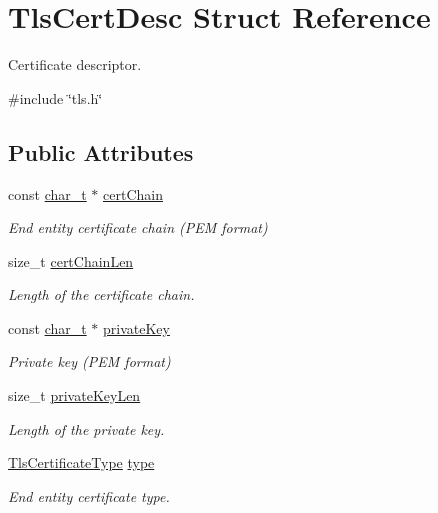 \hypertarget{structTlsCertDesc}{}\section{Tls\+Cert\+Desc Struct Reference}
\label{structTlsCertDesc}


Certificate descriptor.  




{\ttfamily \#include \char`\"{}tls.\+h\char`\"{}}

\subsection*{Public Attributes}
\begin{DoxyCompactItemize}
\item 
const \hyperlink{compiler__port_8h_a40bb5262bf908c328fbcfbe5d29d0201}{char\+\_\+t} $\ast$ \hyperlink{structTlsCertDesc_ae944e03a44368e92bb4955f890381d3d}{cert\+Chain}
\begin{DoxyCompactList}\small\item\em End entity certificate chain (P\+EM format) \end{DoxyCompactList}\item 
size\+\_\+t \hyperlink{structTlsCertDesc_a3b679e405c99f9989713292148f36149}{cert\+Chain\+Len}
\begin{DoxyCompactList}\small\item\em Length of the certificate chain. \end{DoxyCompactList}\item 
const \hyperlink{compiler__port_8h_a40bb5262bf908c328fbcfbe5d29d0201}{char\+\_\+t} $\ast$ \hyperlink{structTlsCertDesc_a3ae3164c84e83982d57e805167860459}{private\+Key}
\begin{DoxyCompactList}\small\item\em Private key (P\+EM format) \end{DoxyCompactList}\item 
size\+\_\+t \hyperlink{structTlsCertDesc_a9e7c26f2f43e5192fd69b0d48f3558bd}{private\+Key\+Len}
\begin{DoxyCompactList}\small\item\em Length of the private key. \end{DoxyCompactList}\item 
\hyperlink{tls_8h_a9bd45859e2bffbd3edb8beff07240ffd}{Tls\+Certificate\+Type} \hyperlink{structTlsCertDesc_af06c965a4e4273bfb971f6ab67c715a2}{type}
\begin{DoxyCompactList}\small\item\em End entity certificate type. \end{DoxyCompactList}\item 

\end{DoxyCompactItemize}
